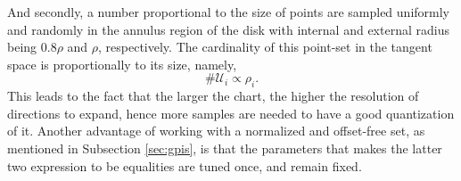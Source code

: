 And secondly, a number proportional to the size of points are sampled uniformly and randomly in the annulus region of the disk with internal and external radius being $0.8\rho$ and $\rho$, respectively. The cardinality of this point-set in the tangent space is proportionally to its size, namely,
\begin{equation}
\#\mathcal{U}_i \propto \rho_i.
\end{equation}
This leads to the fact that the larger the chart, the higher the resolution of directions to expand, hence more samples are needed to have a good quantization of it.
Another advantage of working with a normalized and offset-free set, as mentioned in Subsection \ref{sec:gpis}, is that the parameters that makes the latter two expression to be equalities are tuned once, and remain fixed.

